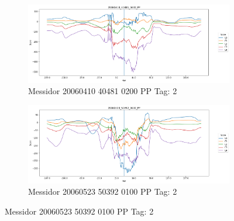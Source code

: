 \begin{figure}[ht!]
	\centering
	\begin{subfigure}[b]{ 0.85\textwidth}
		\centering
		\includegraphics[width=\textwidth]{Figures/chapter_stability/20060410_40481_0200_PP/h/scores.png}
		\caption{Messidor 20060410 40481 0200 PP Tag: 2}		
	\end{subfigure}
	\begin{subfigure}[b]{ 0.85\textwidth}
		\centering
		\includegraphics[width=\textwidth]{Figures/chapter_stability/20060523_50392_0100_PP/h/scores.png}
		\caption{Messidor 20060523 50392 0100 PP Tag: 2}		
	\end{subfigure}
	

\end{figure}
